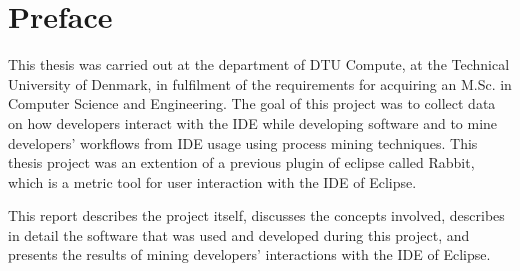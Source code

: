 \chapter{Preface}
\vspace{-15mm}
This thesis was carried out at the department of DTU Compute, at the Technical University of Denmark, in fulfilment of the requirements for acquiring an M.Sc. in Computer Science and Engineering.
The goal of this project was to collect data on how developers interact with the IDE while developing software and to mine developers' workflows from IDE usage using process mining techniques. 
This thesis project was an extention of a previous plugin of eclipse called Rabbit, which is a metric tool for user interaction with the IDE of Eclipse. 

This report describes the project itself, discusses the concepts involved, describes in detail the software that was used and developed during this project, and
presents the results of mining developers' interactions with the IDE of Eclipse.%
